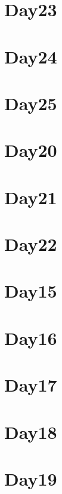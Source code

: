 
\section*{Day23}

\vfill
\section*{Day24}

\vfill
\section*{Day25}

\vfill
\section*{Day20}

\vfill
\section*{Day21}

\vfill
\section*{Day22}

\vfill
\section*{Day15}

\vfill
\section*{Day16}

\vfill
\section*{Day17}

\vfill
\section*{Day18}

\vfill
\section*{Day19}

\vfill
